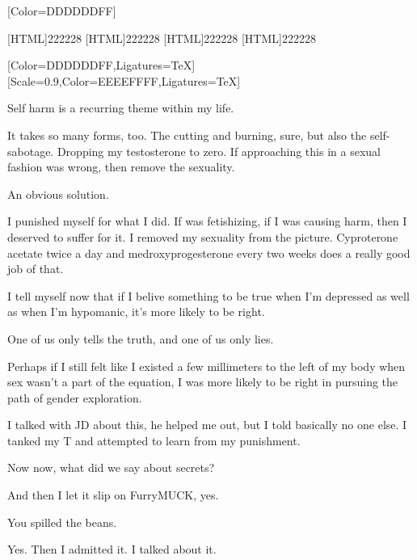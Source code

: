 \renewfontfamily{}[Color=DDDDDDFF]

[HTML]{222228}
[HTML]{222228}
[HTML]{222228}
[HTML]{222228}

\begin{paracol}{2}
\begin{leftcolumn}

[Color=DDDDDDFF,Ligatures=TeX]
\renewfontfamily{}[Scale=0.9,Color=EEEEFFFF,Ligatures=TeX]

\noindent Self harm is a recurring theme within my life.

It takes so many forms, too. The cutting and burning, sure, but also the self-sabotage. Dropping my testosterone to zero. If approaching this in a sexual fashion was wrong, then remove the sexuality.

\begin{ally}
An obvious solution.
\end{ally}
I punished myself for what I did. If was fetishizing, if I was causing harm, then I deserved to suffer for it. I removed my sexuality from the picture. Cyproterone acetate twice a day and medroxyprogesterone every two weeks does a really good job of that.

I tell myself now that if I belive something to be true when I'm depressed as well as when I'm hypomanic, it's more likely to be right.

\begin{ally}
One of us only tells the truth, and one of us only lies.
\end{ally}
Perhaps if I still felt like I existed a few millimeters to the left of my body when sex wasn't a part of the equation, I was more likely to be right in pursuing the path of gender exploration.

I talked with JD about this, he helped me out, but I told basically no one else. I tanked my T and attempted to learn from my punishment.

\begin{ally}
Now now, what did we say about secrets?
\end{ally}
And then I let it slip on FurryMUCK, yes.

\begin{ally}
You spilled the beans.
\end{ally}
Yes. Then I admitted it. I talked about it.


\end{leftcolumn}
\end{paracol}
